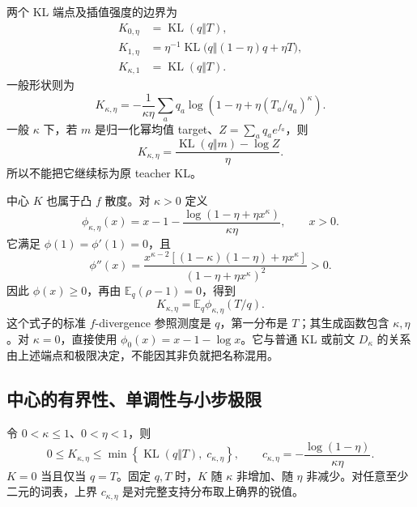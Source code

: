 \documentclass[lang=cn,scheme=chinese,openany]{../book/elegantbook}
\newcommand{\E}{\mathbb E}
\newcommand{\KL}{\operatorname{KL}}
\begin{document}
两个 KL 端点及插值强度的边界为
\begin{align}
 K_{0,\eta}&=\KL(q\Vert T),\\
 K_{1,\eta}&=\eta^{-1}\KL\big(q\Vert(1-\eta)q+\eta T\big),\\
 K_{\kappa,1}&=\KL(q\Vert T).
 \label{eq:divergence-map-center-endpoints}
\end{align}
一般形状则为
\begin{equation}
 \boxed{K_{\kappa,\eta}
 =-\frac1{\kappa\eta}\sum_aq_a
 \log\left(1-\eta+\eta(T_a/q_a)^\kappa\right).}
 \label{eq:center-expanded-k}
\end{equation}
一般 $\kappa$ 下，若 $m$ 是归一化幂均值 target、$Z=\sum_aq_ae^{f_a}$，则
\begin{equation}
 K_{\kappa,\eta}=\frac{\KL(q\Vert m)-\log Z}{\eta}.
\end{equation}
所以不能把它继续标为原 teacher KL。

中心 $K$ 也属于凸 $f$ 散度。对 $\kappa>0$ 定义
\begin{equation}
 \phi_{\kappa,\eta}(x)=x-1-
 \frac{\log(1-\eta+\eta x^\kappa)}{\kappa\eta},\qquad x>0.
 \label{eq:center-convex-generator}
\end{equation}
它满足 $\phi(1)=\phi'(1)=0$，且
\begin{equation}
 \phi''(x)=
 \frac{x^{\kappa-2}[(1-\kappa)(1-\eta)+\eta x^\kappa]}
 {(1-\eta+\eta x^\kappa)^2}>0.
\end{equation}
因此 $\phi(x)\ge0$，再由 $\E_q(\rho-1)=0$，得到
\begin{equation}
 K_{\kappa,\eta}=\E_q\phi_{\kappa,\eta}(T/q).
 \label{eq:divergence-map-center-family}
\end{equation}
这个式子的标准 $f$-divergence 参照测度是 $q$，第一分布是 $T$；其生成函数包含 $\kappa,\eta$。对 $\kappa=0$，直接使用 $\phi_0(x)=x-1-\log x$。它与普通 KL 或前文 $D_\kappa$ 的关系由上述端点和极限决定，不能因其非负就把名称混用。
\subsection{中心的有界性、单调性与小步极限}

\begin{theorem}[教师中心的分布无关界]
\label{thm:center-bounds-monotonicity}
令 $0<\kappa\le1$、$0<\eta<1$，则
\begin{equation}
 0\le K_{\kappa,\eta}
 \le\min\left\{\KL(q\Vert T),\;
 c_{\kappa,\eta}\right\},\qquad
 c_{\kappa,\eta}=-\frac{\log(1-\eta)}{\kappa\eta}.
 \label{eq:center-uniform-cap}
\end{equation}
$K=0$ 当且仅当 $q=T$。固定 $q,T$ 时，$K$ 随 $\kappa$ 非增加、随 $\eta$ 非减少。对任意至少二元的词表，上界 $c_{\kappa,\eta}$ 是对完整支持分布取上确界的锐值。
\end{theorem}
\end{document}
